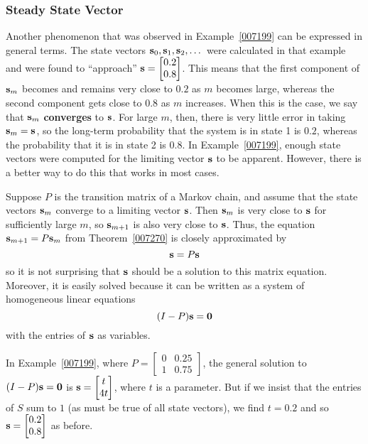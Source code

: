 \documentclass{ximera}
\begin{document}
\subsubsection*{Steady State Vector}

Another phenomenon that was observed in Example~\ref{007199} can be expressed in general terms. The state vectors ${\bf s}_{0}, {\bf s}_{1}, {\bf s}_{2}, \dots$ were calculated in that example and were found to ``approach'' ${\bf s} = \begin{bmatrix}
0.2 \\
0.8
\end{bmatrix}$.
 This means that the first component of ${\bf s}_{m}$ becomes and remains very close to $0.2$ as $m$ becomes large, whereas the second component gets close to $0.8$ as $m$ increases. When this is the case, we say that ${\bf s}_{m}$ \textbf{converges} to ${\bf s}$. For large $m$, then, there is very little error in taking ${\bf s}_{m} = {\bf s}$, so the long-term probability that the system is in state 1 is $0.2$, whereas the probability that it is in state 2 is $0.8$. In Example~\ref{007199}, enough state vectors were computed for the limiting vector ${\bf s}$ to be apparent. However, there is a better way to do this that works in most cases.

Suppose $P$ is the transition matrix of a Markov chain, and assume that the state vectors ${\bf s}_{m}$ converge to a limiting vector ${\bf s}$. Then ${\bf s}_{m}$ is very close to ${\bf s}$ for sufficiently large $m$, so ${\bf s}_{m+1}$ is also very close to ${\bf s}$. Thus, the equation ${\bf s}_{m+1} = P{\bf s}_{m}$ from Theorem~\ref{007270} is closely approximated by
\begin{equation*}
{\bf s} = P{\bf s}
\end{equation*}
so it is not surprising that ${\bf s}$ should be a solution to this matrix equation. Moreover, it is easily solved because it can be written as a system of homogeneous linear equations
\begin{equation*}
(I - P){\bf s} = {\bf 0}
\end{equation*}
with the entries of ${\bf s}$ as variables.


In Example~\ref{007199}, where $P = \begin{bmatrix}
0 & 0.25 \\
1 & 0.75
\end{bmatrix}$,
 the general solution to $(I - P){\bf s} = {\bf 0}$ is ${\bf s} = \begin{bmatrix}
 t \\
 4t
\end{bmatrix}$,
 where $t$ is a parameter. But if we insist that the entries of $S$ sum to $1$ (as must be true of all state vectors), we find $t = 0.2$ and so ${\bf s} = \begin{bmatrix}
 0.2 \\
 0.8
\end{bmatrix}$
 as before.
\end{document}
